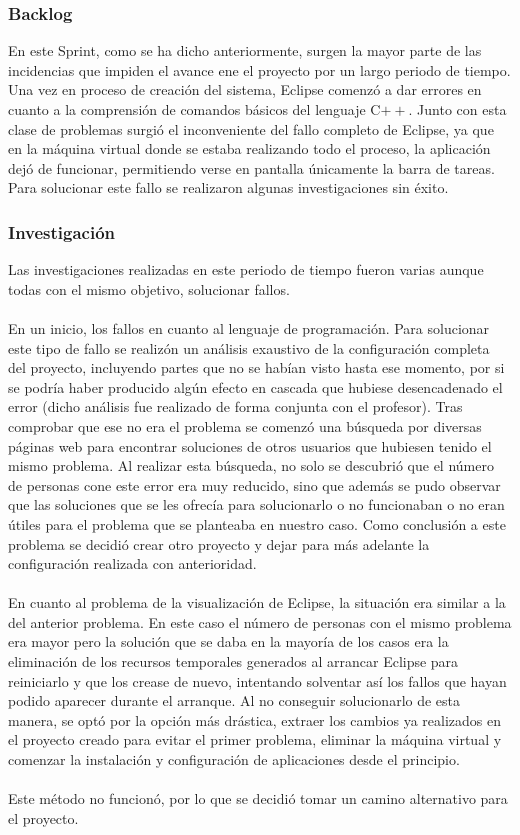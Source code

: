 \subsubsection{Backlog}
En este Sprint, como se ha dicho anteriormente, surgen la mayor parte de las incidencias que impiden el avance ene el proyecto por un largo periodo de tiempo. Una vez en proceso de creación del sistema, Eclipse comenzó a dar errores en cuanto a la comprensión de comandos básicos del lenguaje C$++$. Junto con esta clase de problemas surgió el inconveniente del fallo completo de Eclipse, ya que en la máquina virtual donde se estaba realizando todo el proceso, la aplicación dejó de funcionar, permitiendo verse en pantalla únicamente la barra de tareas. Para solucionar este fallo se realizaron algunas investigaciones sin éxito.\\
\subsubsection{Investigación}
Las investigaciones realizadas en este periodo de tiempo fueron varias aunque todas con el mismo objetivo, solucionar fallos.\\
\\
En un inicio, los fallos en cuanto al lenguaje de programación. Para solucionar este tipo de fallo se realizón un análisis exaustivo de la configuración completa  del proyecto, incluyendo partes que no se habían visto hasta ese momento, por si se podría haber producido algún efecto en cascada que hubiese desencadenado el error (dicho análisis fue realizado de forma conjunta con el profesor). Tras comprobar que ese no era el problema se comenzó una búsqueda por diversas páginas web para encontrar soluciones de otros usuarios que hubiesen tenido el mismo problema. Al realizar esta búsqueda, no solo se descubrió que el número de personas cone este error era muy reducido, sino que además se pudo observar que las soluciones que se les ofrecía para solucionarlo o no funcionaban o no eran útiles para el problema que se planteaba en nuestro caso. Como conclusión a este problema se decidió crear otro proyecto y dejar para más adelante la configuración realizada con anterioridad.\\
\\
En cuanto al problema de la visualización de Eclipse, la situación era similar a la del anterior problema. En este caso el número de personas con el mismo problema era mayor pero la solución que se daba en la mayoría de los casos era la eliminación de los recursos temporales generados al arrancar Eclipse para reiniciarlo y que los crease de nuevo, intentando solventar así los fallos que hayan podido aparecer durante el arranque. Al no conseguir solucionarlo de esta manera, se optó por la opción más drástica, extraer los cambios ya realizados en el proyecto creado para evitar el primer problema, eliminar la máquina virtual y comenzar la instalación y configuración de aplicaciones desde el principio.\\
\\
Este método no funcionó, por lo que se decidió tomar un camino alternativo para el proyecto.

